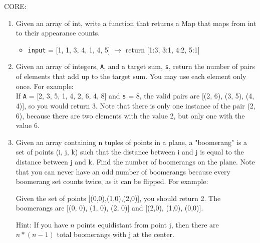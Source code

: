 \documentclass{article}
\begin{document}
    CORE:
    \begin{enumerate}
        \item Given an array of int, write a function that returns a Map that maps from int to their appearance counts.
        \begin{itemize}
            \item \texttt{input} = [1, 1, 3, 4, 1, 4, 5] $\rightarrow$ return [1:3, 3:1, 4:2, 5:1]
        \end{itemize}


        \item Given an array of integers, \texttt{A}, and a target sum, \texttt{s}, return the number of pairs of elements that add up to the target sum.  You may use each element only once.  For example: \\

        If \texttt{A} = [2, 3, 5, 1, 4, 2, 6, 4, 8] and \texttt{s} = 8, the valid pairs are [(2, 6), (3, 5), (4, 4)], so you would return 3.  Note that there is only one instance of the pair (2, 6), because there are two elements with the value 2, but only one with the value 6. \\


        \item Given an array containing n tuples of points in a plane, a "boomerang" is a set of points (i, j, k) such that the distance between i and j is equal to the distance between j and k.  Find the number of boomerangs on the plane. Note that you can never have an odd number of boomerangs because every boomerang set counts twice, as it can be flipped. For example:

        Given the set of points [(0,0),(1,0),(2,0)], you should return 2.  The boomerangs are [(0, 0), (1, 0), (2, 0)] and [(2,0), (1,0), (0,0)].

        Hint: If you have $n$ points equidistant from point j, then there are $n*(n-1)$ total boomerangs with j at the center.

    \end{enumerate}
\end{document}
